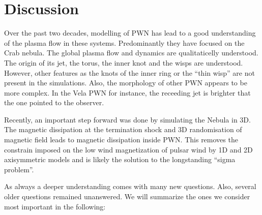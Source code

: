 \section{Discussion}
\label{sec:discussion}

Over the past two decades, modelling of PWN has lead to a good understanding of the plasma flow in these systems. Predominantly they have focused on the Crab nebula.  The global plasma flow and dynamics are qualitaticelly understood. The origin of its jet, the torus, the inner knot and the wisps are understood. However, other features as the knots of the inner ring or the ``thin wisp'' \cite{Hester_1995} are not present in the simulations. Also, the morphology of other PWN appears to be more complex. In the Vela PWN for instance, the receeding jet is brighter that the one pointed to the observer.

Recently, an important step forward was done by simulating the Nebula in 3D. The magnetic dissipation at the termination shock and 3D randomisation of magnetic field leads to magnetic dissipation  inside PWN. This removes the constrain imposed on the low wind magnetization of pulsar wind by 1D and 2D axisymmetric models and is likely the solution to the longstanding ``sigma problem''.

As always a deeper understanding comes with many new questions. Also, several older questions remained unanswered. We will summarize the ones we consider most important in the following: 

